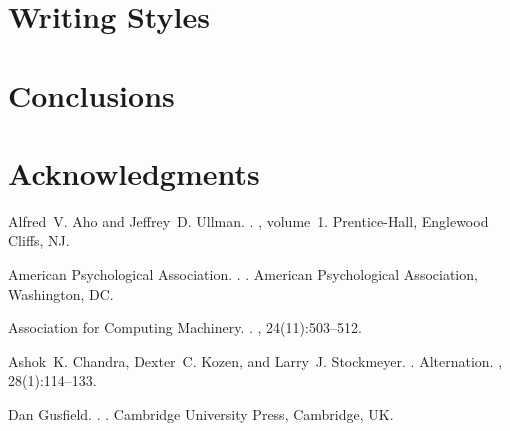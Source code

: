 \documentclass[11pt]{article}
\begin{document}
\section{Writing Styles}


\section{Conclusions}

\section*{Acknowledgments}

\begin{thebibliography}{}

Alfred~V. Aho and Jeffrey~D. Ullman.
.
, volume~1.
\newblock Prentice-{Hall}, Englewood Cliffs, NJ.

{American Psychological Association}.
.
.
\newblock American Psychological Association, Washington, DC.

{Association for Computing Machinery}.
.
, 24(11):503--512.

Ashok~K. Chandra, Dexter~C. Kozen, and Larry~J. Stockmeyer.
.
\newblock Alternation.
,
  28(1):114--133.

Dan Gusfield.
.
.
\newblock Cambridge University Press, Cambridge, UK.

\end{thebibliography}
\end{document}
